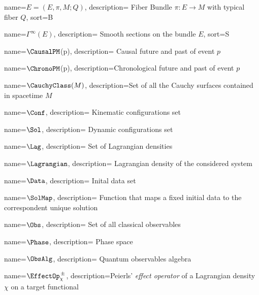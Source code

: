 \usepackage{glossaries}

\makenoidxglossaries


%
{%
	name={\ensuremath{E = (E,\pi , M;Q)}},
	description={ Fiber Bundle $\pi: E\rightarrow M$ with typical fiber $Q$},
    sort={B}
}

%
{%
	name={\ensuremath{\Gamma^\infty(E)}},
	description={ Smooth sections on the bundle $E$},
    sort={S}
}

	{%
		name={\ensuremath{\CausalPM}(p)},
		description={ Causal future and past of event $p$}
	}	

	{%
		name={\ensuremath{\ChronoPM}(p)},
		description={Chronological future and past of event $p$}
	}

	{%
		name={\ensuremath{\CauchyClass(M)}},
		description={Set of all the Cauchy surfaces contained in spacetime $M$}
	}

	{%
		name={\ensuremath{\Conf}},
		description={ Kinematic configurations set}
	}

	{%
		name={\ensuremath{\Sol}},
		description={ Dynamic configurations set}
	}

		
	{%
		name={\ensuremath{\Lag}},
		description={ Set of Lagrangian densities}
	}
		
	{%
		name={\ensuremath{\Lagrangian}},
		description={ Lagrangian density of the considered system}
	}
		
	{%
		name={\ensuremath{\Data}},
		description={ Inital data set}
	}
		
	{%
		name={\ensuremath{\SolMap}},
		description={ Function that maps a fixed initial data to the correspondent unique solution}
	}
		
	{%
		name={\ensuremath{\Obs}},
		description={ Set of all classical observables}
	}

	{%
		name={\ensuremath{\Phase}},
		description={ Phase space}
	}
	
	{%
		name={\ensuremath{\ObsAlg}},
		description={ Quantum observables algebra}
	}
	

	
	{%
		name={\ensuremath{\EffectOp_\chi^{\, \pm}}},
		description={Peierls' \emph{effect operator} of a Lagrangian density $\chi$ on a target functional}
	}